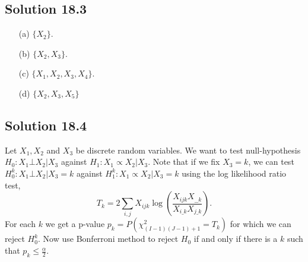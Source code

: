 \subsection*{Solution 18.3}

\begin{itemize}
    \item[(a)] $\{X_2\}$.
    \item[(b)] $\{X_2, X_3\}$.
    \item[(c)] $\{X_1, X_2, X_3, X_4\}$.
    \item[(d)] $\{X_2, X_3, X_5\}$
\end{itemize}


\subsection*{Solution 18.4}

Let $X_1, X_2$ and $X_3$ be discrete random variables.
We want to test null-hypothesis $H_0: X_1 \bot X_2 | X_3$ against $H_1: X_1 \propto X_2 | X_3$.
Note that if we fix $X_3 = k$, we can test $H_0^{k}: X_1 \bot X_2 | X_3 = k$ against $H_1^{k}: X_1 \propto X_2 | X_3 = k$ using the log likelihood ratio test,
\begin{equation*}
    T_k = 2 \sum_{i, j} X_{ijk} \log\left(\frac{X_{ijk} X_{\_\_k}}{X_{i\_k} X_{j\_k}}\right).
\end{equation*}
For each $k$ we get a p-value $p_k = P(\chi^2_{(I-1)(J-1) + 1} = T_k)$ for which we can reject $H_0^{k}$.
Now use Bonferroni method to reject $H_0$ if and only if there is a $k$ such that $p_k \leq \frac{\alpha}{2}$.

